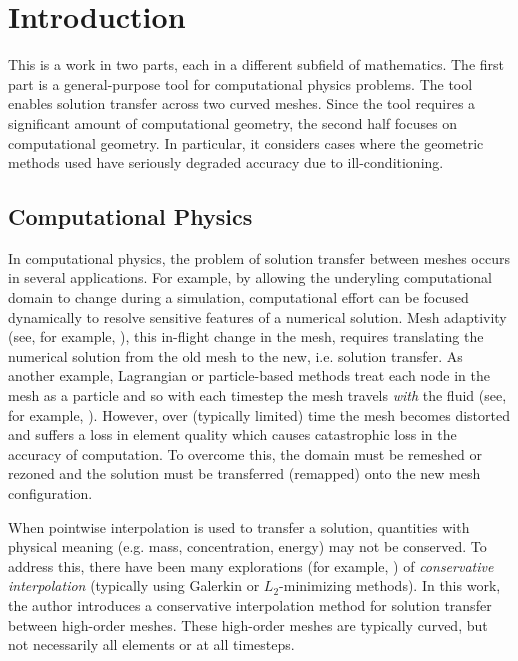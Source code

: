 \chapter{Introduction}

This is a work in two parts, each in a different subfield of mathematics.
The first part is a general-purpose tool for computational physics problems.
The tool enables solution transfer across two curved meshes.
Since the tool requires a significant amount of computational geometry, the
second half focuses on computational geometry. In particular, it considers
cases where the geometric methods used have seriously degraded accuracy due to
ill-conditioning.

\section{Computational Physics}

In computational physics, the problem of solution transfer between meshes
occurs in several applications. For example, by allowing the underyling
computational domain to change during a simulation, computational
effort can be focused dynamically to resolve sensitive features
of a numerical solution. Mesh adaptivity (see, for example,
\cite{Babuska1978, Peraire1987, Pain2001}), this in-flight change in the mesh,
requires translating the numerical solution from the old mesh to the new,
i.e. solution transfer. As another example, Lagrangian or particle-based
methods treat each node in the mesh as a particle and so with each timestep the
mesh travels \emph{with} the fluid (see, for example, \cite{Hirt1974}).
However, over (typically limited) time the mesh
becomes distorted and suffers a loss in element quality which causes
catastrophic loss in the accuracy of computation. To overcome this, the
domain must be remeshed or rezoned and the solution must be
transferred (remapped) onto the new mesh configuration.

When pointwise interpolation is used to transfer a solution, quantities with
physical meaning (e.g. mass, concentration, energy) may not be conserved.
To address this, there have been many explorations (for example,
\cite{Jiao2004, Farrell2009, Farrell2011}) of
\emph{conservative interpolation} (typically using Galerkin or
\(L_2\)-minimizing methods). In this work, the author introduces a
conservative interpolation method for solution transfer between high-order
meshes. These high-order meshes are typically curved, but not necessarily
all elements or at all timesteps.

